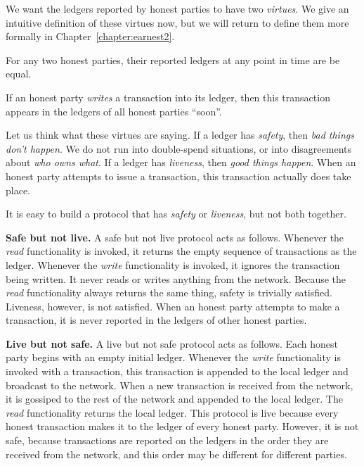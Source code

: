 We want the ledgers reported by honest parties to have two \emph{virtues}. We give
an intuitive definition of these virtues now, but we will return to define them
more formally in Chapter~\ref{chapter:earnest2}.

\begin{definition}\label{def:safety-informal}
    For any two honest parties, their reported ledgers at any point in time
    are be equal.
\end{definition}

\begin{definition}\label{def:liveness-informal}
    If an honest party \emph{writes} a transaction into its ledger, then this
    transaction appears in the ledgers of all honest parties ``soon''.
\end{definition}

Let us think what these virtues are saying. If a ledger has \emph{safety},
then \emph{bad things don't happen}. We do not run into double-spend situations,
or into disagreements about \emph{who owns what}. If a ledger has \emph{liveness},
then \emph{good things happen}. When an honest party attempts to issue a transaction,
this transaction actually does take place.

It is easy to build a protocol that has \emph{safety} or \emph{liveness}, but not
both together.

\noindent
\textbf{Safe but not live.} A safe but not live protocol acts as follows.
Whenever the \emph{read} functionality is invoked, it returns the empty sequence of
transactions as the ledger. Whenever the \emph{write} functionality is invoked, it
ignores the transaction being written. It never reads or writes anything from the
network. Because the \emph{read} functionality always returns the same thing,
safety is trivially satisfied. Liveness, however, is not satisfied. When an honest
party attempts to make a transaction, it is never reported in the ledgers of other
honest parties.

\noindent
\textbf{Live but not safe.} A live but not safe protocol acts as follows.
Each honest party begins with an empty initial ledger. Whenever the \emph{write}
functionality is invoked with a transaction, this transaction is appended to the
local ledger and broadcast to the network. When a new transaction is received from the
network, it is gossiped to the rest of the network and appended to the local ledger.
The \emph{read} functionality returns the local ledger. This protocol is live
because every honest transaction makes it to the ledger of every honest party.
However, it is not safe, because transactions are reported on the ledgers in the
order they are received from the network, and this order may be different for
different parties.

